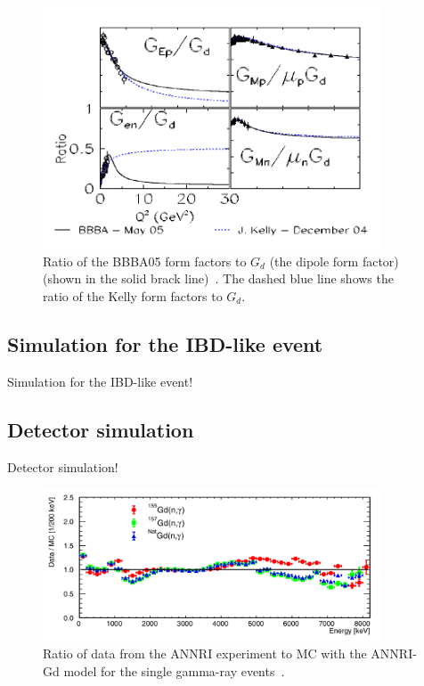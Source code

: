 \begin{figure}[tbp]
	\centering
	\includegraphics[width=10cm]{Figures/Simulation/BBBA05}
	\caption[Ratio of the BBBA05 form factors to $G_{d}$]{\label{Simula_BBBA05} Ratio of the BBBA05 form factors to $G_{d}$ (the dipole form factor) (shown in the solid brack line)~\cite{2006Bradford}. The dashed blue line shows the ratio of the Kelly form factors to $G_{d}$.}
\end{figure}

\subsection{Simulation for the IBD-like event}
\vs\hs Simulation for the IBD-like event!

\subsection{Detector simulation}
\vs\hs Detector simulation!

\begin{figure}[tbp]
	\centering
	\includegraphics[width=10cm]{Figures/Simulation/RatioGdGam}
	\caption[Ratio of data from the ANNRI experiment by MC with the ANNRI-Gd model for the single gamma-ray events]{\label{Simula_RatioGdGam} Ratio of data from the ANNRI experiment to MC with the ANNRI-Gd model for the single gamma-ray events~\cite{2020Tanaka}.}
\end{figure}

\newpage
